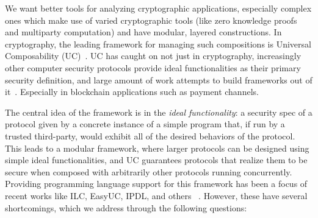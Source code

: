 We want better tools for analyzing cryptographic applications, especially complex ones which make use of varied cryptographic tools (like zero knowledge proofs and multiparty computation) and have modular, layered constructions.
In cryptography, the leading framework for managing such compositions is Universal Composability (UC)~\cite{canettiUC}.
UC has caught on not just in cryptography, increasingly other computer security protocols provide ideal functionalities as their primary security definition, and large amount of work attempts to build frameworks out of it~\cite{suc, gnuc, camenischuc}.
Especially in blockchain applications such as payment channels.

The central idea of the framework is in the \emph{ideal functionality}: a security spec of a protocol given by a concrete instance of a simple program that, if run by a trusted third-party, would exhibit all of the desired behaviors of the protocol.
This leads to a modular framework, where larger protocols can be designed using simple ideal functionalities, and UC guarantees protocols that realize them to be secure when composed with arbitrarily other protocols running concurrently.
Providing programming language support for this framework has been a focus of recent works like ILC, EasyUC, IPDL, and others~\cite{ilc, easyuc, ipdl, sybolicuc, barbosa} . However, these have several shortcomings, which we address through the following questions:

